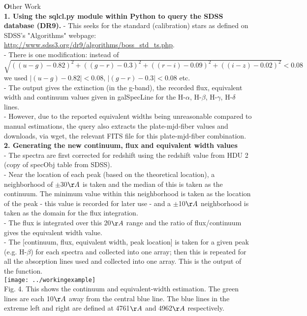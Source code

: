 \documentclass[12pt]{article}
\begin{document}
{\LARGE \textbf Other Work} \\
\textbf {1. Using the sqlcl.py module within Python to query the SDSS database (DR9).}
- This seeks for the standard (calibration) stars as defined on SDSS's "Algorithms" webpage: \url{http://www.sdss3.org/dr9/algorithms/boss_std_ts.php}. \\
- There is one modification: instead of \\ $\sqrt{((u-g)-0.82)^2+((g-r)-0.3)^2+((r-i)-0.09)^2+((i-z)-0.02)^2}<0.08$ we used $|(u-g)-0.82|<0.08$, $|(g-r)-0.3|<0.08$ etc. \\
- The output gives the extinction (in the g-band), the recorded flux, equivalent width and continuum values given in galSpecLine for the H-$\alpha$, H-$\beta$, H-$\gamma$, H-$\delta$ lines. \\
- However, due to the reported equivalent widths being unreasonable compared to manual estimations, the query also extracts the plate-mjd-fiber values and downloads, via wget, the relevant FITS file for this plate-mjd-fiber combination. \\
\textbf{2. Generating the new continuum, flux and equivalent width values}\\
- The spectra are first corrected for redshift using the redshift value from HDU 2 (copy of specObj table from SDSS).\\
- Near the location of each peak (based on the theoretical location), a neighborhood of $\pm$30$\AA$ is taken and the median of this is taken as the continuum. The minimum value within this neighborhood is taken as the location of the peak - this value is recorded for later use - and a $\pm$10$\AA$ neighborhood is taken as the domain for the flux integration.\\
- The flux is integrated over this 20$\AA$ range and the ratio of flux/continuum gives the equivalent width value.\\
- The [continuum, flux, equivalent width, peak location] is taken for a given peak (e.g. H-$\beta$) for each spectra and collected into one array; then this is repeated for all the absorption lines used and collected into one array. This is the output of the function. \\
\texttt{[image: ../workingexample]}\\
Fig. 4. This shows the continuum and equivalent-width estimation. The green lines are each 10$\AA$  away from the central blue line. The blue lines in the extreme left and right are defined at 4761$\AA$ and 4962$\AA$  respectively.
\end{document}
